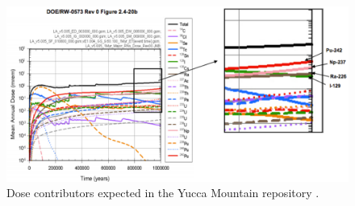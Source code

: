 \begin{figure}[htbp!]
  \begin{center}
    \includegraphics[width=0.7\textheight]{swift_dose_yucca.eps}
  \end{center}
  \caption{Dose contributors expected in the Yucca Mountain repository 
    \cite{swift_applying_2010}.}
  \label{fig:swift_dose_yucca}
\end{figure}
